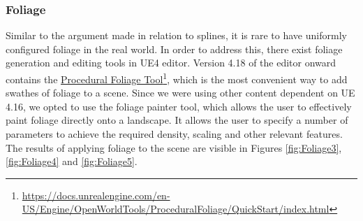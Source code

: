 \subsubsection{Foliage}
Similar to the argument made in relation to splines, it is rare to have uniformly configured foliage in the real world. In order to address this, there exist foliage generation and editing tools in UE4 editor. Version 4.18 of the editor onward contains the \href{https://docs.unrealengine.com/en-US/Engine/OpenWorldTools/ProceduralFoliage/QuickStart/index.html}{Procedural Foliage Tool}\footnote{\href {https://docs.unrealengine.com/en-US/Engine/OpenWorldTools/ProceduralFoliage/QuickStart/index.html}{https://docs.unrealengine.com/en-US/Engine/OpenWorldTools/ProceduralFoliage/QuickStart/index.html}}, 
which is the most convenient way to add swathes of foliage to a scene. Since we were using other content dependent on UE 4.16, we opted to use the foliage painter tool, which allows the user to effectively paint foliage directly onto a landscape. It allows the user to specify a number of parameters to achieve the required density, scaling and other relevant features. The results of applying foliage to the scene are visible in Figures \ref{fig:Foliage3}, \ref{fig:Foliage4} and \ref{fig:Foliage5}.

